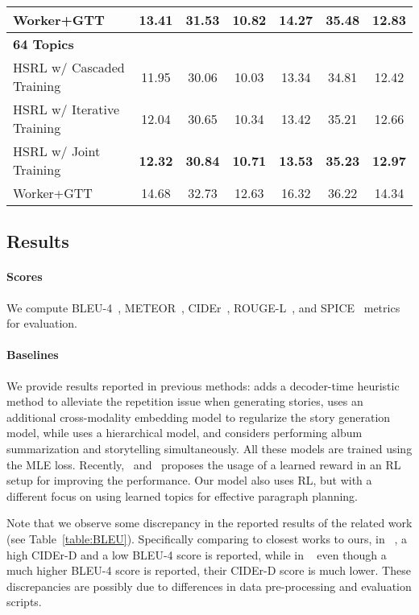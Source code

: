 \documentclass[letterpaper]{article} \usepackage{aaai19}  \usepackage{times}  \usepackage{helvet}  \usepackage{courier}  \usepackage{url}  \usepackage{graphicx}
\begin{document}
{\begin{table*}[htb]
\begin{tabular}{lcccccc}
			Worker+GTT & 13.41 & 31.53 & 10.82 & 14.27 & 35.48 & 12.83 \\
			\hline
			\multicolumn{7}{l}{\textbf{64 Topics}} \\
			\hline
			HSRL w/ Cascaded Training & 11.95 & 30.06 & 10.03 & 13.34 & 34.81 & 12.42 \\
			HSRL w/ Iterative Training & 12.04 & 30.65 & 10.34 & 13.42 & 35.21 & 12.66 \\
			HSRL w/ Joint Training & \textbf{12.32} & \textbf{30.84}&  \textbf{10.71} &  \textbf{13.53} & \textbf{35.23} &   \textbf{12.97}\\
			Worker+GTT & 14.68 & 32.73 & 12.63 & 16.32 & 36.22 & 14.34 \\
			\hline
		\end{tabular}
\end{table*}
}

\subsection{Results}\label{subsec:Evaluation}
\paragraph{Scores} 
We compute BLEU-4~\cite{papineni2002bleu}, METEOR~\cite{banerjee2005meteor}, CIDEr~\cite{vedantam2015cider}, ROUGE-L~\cite{lin2004rouge}, and SPICE~\cite{anderson2016spice} metrics for evaluation. 

\paragraph{Baselines} 
We provide results reported in previous methods: \cite{huang2016visual} adds a decoder-time heuristic method to alleviate the repetition issue when generating stories, \cite{liu2017let} uses an additional cross-modality embedding model to regularize the story generation model, while \cite{yu2017hierarchically} uses a hierarchical model, and considers performing album summarization and storytelling simultaneously. All these models are trained using the MLE loss. Recently,~\cite{wang2018no} and~\cite{wang2018show} proposes the usage of a learned reward in an RL setup for improving the performance. Our model also uses RL, but with a different focus on using learned topics for effective paragraph planning. 


Note that we observe some discrepancy in the reported results of the related work (see Table~\ref{table:BLEU}). Specifically comparing to closest works to ours, in ~\cite{wang2018show}, a high CIDEr-D and a low BLEU-4 score is reported, while in ~\cite{wang2018no} even though a much higher BLEU-4 score is reported, their CIDEr-D score is much lower. 
These discrepancies are possibly due to differences in data pre-processing and evaluation scripts. 
\end{document}
